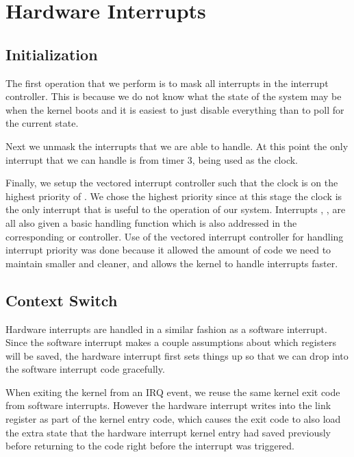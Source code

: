 \documentclass[pdftex,10pt,a4paper]{article}
\begin{document}
\newpage
\section*{Hardware Interrupts}

\subsection*{Initialization}

The first operation that we perform is to mask all interrupts in the
interrupt controller. This is because we do not know what the state of
the system may be when the kernel boots and it is easiest to just
disable everything than to poll for the current state.

Next we unmask the interrupts that we are able to handle. At this
point the only interrupt that we can handle is from timer 3, being
used as the clock.

Finally, we setup the vectored interrupt controller such that the
clock is on the highest priority of . We chose the highest
priority since at this stage the clock is the only interrupt that is
useful to the operation of our system. Interrupts , ,
 are all also given a basic handling function which is also
addressed in the corresponding  or 
controller. Use of the vectored interrupt controller for handling
interrupt priority was done because it allowed the amount of code we
need to maintain smaller and cleaner, and allows the kernel to handle
interrupts faster.

\subsection*{Context Switch}

Hardware interrupts are handled in a similar fashion as a software
interrupt. Since the software interrupt makes a couple assumptions
about which registers will be saved, the hardware interrupt first sets
things up so that we can drop into the software interrupt code
gracefully.

When exiting the kernel from an IRQ event, we reuse the same kernel
exit code from software interrupts. However the hardware interrupt
writes  into the link register as part of the kernel entry
code, which causes the exit code to also load the extra state that the
hardware interrupt kernel entry had saved previously before returning
to the code right before the interrupt was triggered.
\end{document}
